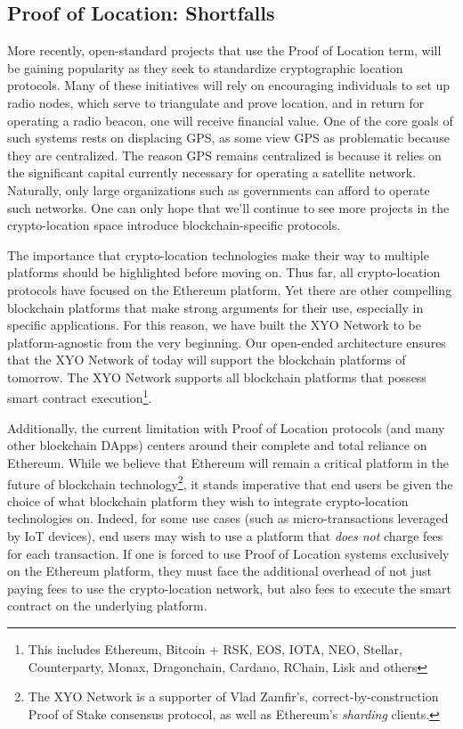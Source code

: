 \documentclass{article}
\begin{document}
\subsection {Proof of Location: Shortfalls}
More recently, open-standard projects that use the Proof of Location term, will be gaining popularity as they seek to standardize cryptographic location protocols. Many of these initiatives will rely on encouraging individuals to set up radio nodes, which serve to triangulate and prove location, and in return for operating a radio beacon, one will receive financial value. One of the core goals of such systems rests on displacing GPS, as some view GPS as problematic because they are centralized. The reason GPS remains centralized is because it relies on the significant capital currently necessary for operating a satellite network. Naturally, only large organizations such as governments can afford to operate such networks. One can only hope that we'll continue to see more projects in the crypto-location space introduce blockchain-specific protocols.

The importance that crypto-location technologies make their way to multiple platforms should be highlighted before moving on. Thus far, all crypto-location protocols have focused on the Ethereum platform. Yet there are other compelling blockchain platforms that make strong arguments for their use, especially in specific applications. For this reason, we have built the XYO Network to be platform-agnostic from the very beginning. Our open-ended architecture ensures that the XYO Network of today will support the blockchain platforms of tomorrow. The XYO Network supports all blockchain platforms that possess smart contract execution\footnote{This includes Ethereum, Bitcoin + RSK, EOS, IOTA, NEO, Stellar, Counterparty, Monax, Dragonchain, Cardano, RChain, Lisk and others}.

Additionally, the current limitation with Proof of Location protocols (and many other blockchain DApps) centers around their complete and total reliance on Ethereum. While we believe that Ethereum will remain a critical platform in the future of blockchain technology\footnote{The XYO Network is a supporter of Vlad Zamfir's, correct-by-construction Proof of Stake consensus protocol, as well as Ethereum's \textit{sharding} clients.}, it stands imperative that end users be given the choice of what blockchain platform they wish to integrate crypto-location technologies on. Indeed, for some use cases (such as micro-transactions leveraged by IoT devices), end users may wish to use a platform that \textit{does not} charge fees for each transaction. If one is forced to use Proof of Location systems exclusively on the Ethereum platform, they must face the additional overhead of not just paying fees to use the crypto-location network, but also fees to execute the smart contract on the underlying platform.
\end{document}
